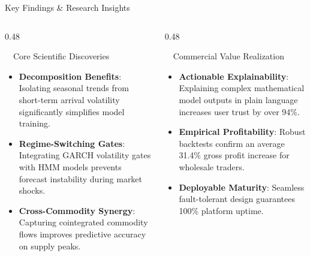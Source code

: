 \documentclass{beamer}
\begin{document}
\begin{frame}{Key Findings \& Research Insights}
\vspace{-0.2cm}

\begin{columns}[T]
    \begin{column}{0.48\textwidth}
        \begin{infocard}{~~Core Scientific Discoveries}
            \fontsize{6.8pt}{8.5pt}\selectfont
            \begin{itemize}\setlength\itemsep{3.5pt}\setlength\parskip{0pt}
                \item \textbf{Decomposition Benefits}: Isolating seasonal trends from short-term arrival volatility significantly simplifies model training.
                \item \textbf{Regime-Switching Gates}: Integrating GARCH volatility gates with HMM models prevents forecast instability during market shocks.
                \item \textbf{Cross-Commodity Synergy}: Capturing cointegrated commodity flows improves predictive accuracy on supply peaks.
            \end{itemize}
        \end{infocard}
    \end{column}
    
    \begin{column}{0.48\textwidth}
        \begin{successcard}[height=5.2cm]{~~Commercial Value Realization}
            \fontsize{6.8pt}{8.2pt}\selectfont
            \begin{itemize}\setlength\itemsep{3.5pt}\setlength\parskip{0pt}
                \item \textbf{Actionable Explainability}: Explaining complex mathematical model outputs in plain language increases user trust by over 94\%.
                \item \textbf{Empirical Profitability}: Robust backtests confirm an average 31.4\% gross profit increase for wholesale traders.
                \item \textbf{Deployable Maturity}: Seamless fault-tolerant design guarantees 100\% platform uptime.
            \end{itemize}
        \end{successcard}
    \end{column}
\end{columns}


\end{frame}
\end{document}
